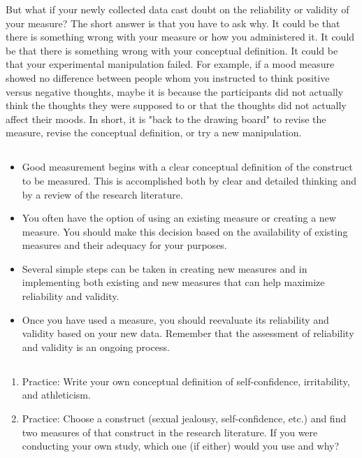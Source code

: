 But what if your newly collected data cast doubt on the reliability or validity of your measure? The short answer is that you have to ask why. It could be that there is something wrong with your measure or how you administered it. It could be that there is something wrong with your conceptual definition. It could be that your experimental manipulation failed. For example, if a mood measure showed no difference between people whom you instructed to think positive versus negative thoughts, maybe it is because the participants did not actually think the thoughts they were supposed to or that the thoughts did not actually affect their moods. In short, it is "back to the drawing board" to revise the measure, revise the conceptual definition, or try a new manipulation.


\subsection{}
\begin{fullwidth}
\begin{itemize}

\item Good measurement begins with a clear conceptual definition of the construct to be measured. This is accomplished both by clear and detailed thinking and by a review of the research literature.
\item You often have the option of using an existing measure or creating a new measure. You should make this decision based on the availability of existing measures and their adequacy for your purposes.
\item Several simple steps can be taken in creating new measures and in implementing both existing and new measures that can help maximize reliability and validity.

\item Once you have used a measure, you should reevaluate its reliability and validity based on your new data. Remember that the assessment of reliability and validity is an ongoing process.

\end{itemize}
\end{fullwidth}


\subsection{}
\begin{fullwidth}
\begin{enumerate}
\item Practice: Write your own conceptual definition of self-confidence, irritability, and athleticism.
\item Practice: Choose a construct (sexual jealousy, self-confidence, etc.) and find two measures of that construct in the research literature. If you were conducting your own study, which one (if either) would you use and why?

\end{enumerate}
\end{fullwidth}
